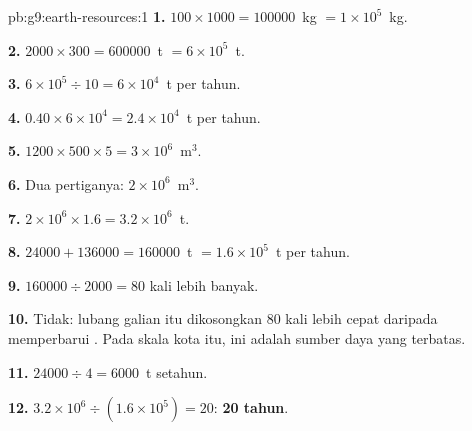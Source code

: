 \begin{solution}{pb:g9:earth-resources:1}
\textbf{1.} $100 \times 1000 = \num{100000}$~kg $= 1 \times 10^5$~kg.

\textbf{2.} $2000 \times 300 = \num{600000}$~t $= 6 \times 10^5$~t.

\textbf{3.} $6 \times 10^5 \div 10 = 6 \times 10^4$~t per tahun.

\textbf{4.} $0.40 \times 6 \times 10^4 = 2.4 \times 10^4$~t  per
tahun.

\textbf{5.} $1200 \times 500 \times 5 = 3 \times 10^6$~m$^3$.

\textbf{6.} Dua pertiganya: $2 \times 10^6$~m$^3$.

\textbf{7.} $2 \times 10^6 \times 1.6 = 3.2 \times 10^6$~t.

\textbf{8.} $\num{24000} + \num{136000} = \num{160000}$~t $= 1.6 \times
10^5$~t per tahun.

\textbf{9.} $\num{160000} \div 2000 = 80$ kali lebih banyak.

\textbf{10.} Tidak: lubang galian itu dikosongkan 80 kali lebih cepat
daripada  memperbarui . Pada skala kota itu,  ini
adalah sumber daya yang terbatas.

\textbf{11.} $\num{24000} \div 4 = \num{6000}$~t  setahun.

\textbf{12.} $3.2 \times 10^6 \div (1.6 \times 10^5) = 20$: \textbf{20 tahun}.
\end{solution}
